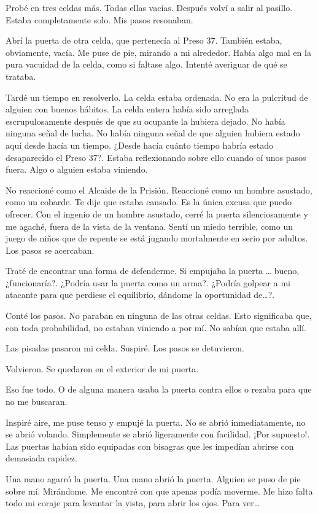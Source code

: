 Probé en tres celdas más. Todas ellas vacías. Después volví a salir al
pasillo. Estaba completamente solo. Mis pasos resonaban.

Abrí la puerta de otra celda, que pertenecía al Preso 37. También
estaba, obviamente, vacía. Me puse de pie, mirando a mi alrededor. Había
algo mal en la pura vacuidad de la celda, como si faltase algo. Intenté
averiguar de qué se trataba.

Tardé un tiempo en resolverlo. La celda estaba ordenada. No era la
pulcritud de alguien con buenos hábitos. La celda entera había sido
arreglada escrupulosamente después de que su ocupante la hubiera dejado.
No había ninguna señal de lucha. No había ninguna señal de que alguien
hubiera estado aquí desde hacía un tiempo. ¿Desde hacía cuánto tiempo
habría estado desaparecido el Preso 37?. Estaba reflexionando sobre ello
cuando oí unos pasos fuera. Algo o alguien estaba viniendo.

No reaccioné como el Alcaide de la Prisión. Reaccioné como un hombre
asustado, como un cobarde. Te dije que estaba cansado. Es la única
excusa que puedo ofrecer. Con el ingenio de un hombre asustado, cerré la
puerta silenciosamente y me agaché, fuera de la vista de la ventana.
Sentí un miedo terrible, como un juego de niños que de repente se está
jugando mortalmente en serio por adultos. Los pasos se acercaban.

Traté de encontrar una forma de defenderme. Si empujaba la puerta
\ldots{} bueno, ¿funcionaría?. ¿Podría usar la puerta como un arma?.
¿Podría golpear a mi atacante para que perdiese el equilibrio, dándome
la oportunidad de\ldots{}?.

Conté los pasos. No paraban en ninguna de las otras celdas. Esto
significaba que, con toda probabilidad, no estaban viniendo a por mí. No
sabían que estaba allí.

Las pisadas pasaron mi celda. Suspiré. Los pasos se detuvieron.

Volvieron. Se quedaron en el exterior de mi puerta.

Eso fue todo. O de alguna manera usaba la puerta contra ellos o rezaba
para que no me buscaran.

Inspiré aire, me puse tenso y empujé la puerta. No se abrió
inmediatamente, no se abrió volando. Simplemente se abrió ligeramente
con facilidad. ¡Por supuesto!. Las puertas habían sido equipadas con
bisagras que les impedían abrirse con demasiada rapidez.

Una mano agarró la puerta. Una mano abrió la puerta. Alguien se puso de
pie sobre mí. Mirándome. Me encontré con que apenas podía moverme. Me
hizo falta todo mi coraje para levantar la vista, para abrir los ojos.
Para ver\ldots{}


